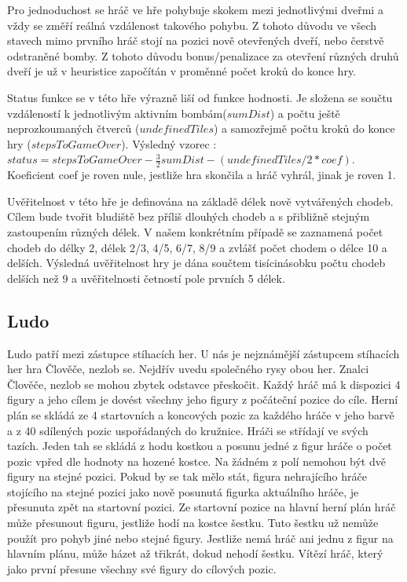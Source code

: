 Pro jednoduchost se hráč ve hře pohybuje skokem mezi jednotlivými dveřmi a vždy se změří reálná vzdálenost takového pohybu. Z tohoto důvodu ve všech stavech mimo prvního hráč stojí na pozici nově otevřených dveří, nebo čerstvě odstraněné bomby. Z tohoto důvodu bonus/penalizace za otevření různých druhů dveří je už v heuristice započítán v proměnné počet kroků do konce hry.

Status funkce se v této hře výrazně liší od funkce hodnosti. Je složena se součtu vzdáleností k jednotlivým aktivním bombám($sumDist$) a počtu ještě neprozkoumaných čtverců ($undefinedTiles$) a samozřejmě počtu kroků do konce hry ($stepsToGameOver$). Výsledný vzorec : $status = stepsToGameOver - \frac{3}{2}sumDist-(undefinedTiles / 2 * coef)$. Koeficient coef je roven nule, jestliže hra skončila a hráč vyhrál, jinak je roven 1. 

Uvěřitelnost v této hře je definována na základě délek nově vytvářených chodeb. Cílem bude tvořit bludiště bez příliš dlouhých chodeb a s přibližně stejným zastoupením různých délek. V našem konkrétním případě se zaznamená počet chodeb do délky 2, délek 2/3, 4/5, 6/7, 8/9 a zvlášť počet chodem o délce 10 a delších. Výsledná uvěřitelnost hry je dána součtem tisícinásobku počtu chodeb delších než 9 a uvěřitelnosti četností pole prvních 5 délek.

\subsection{Ludo}

Ludo patří mezi zástupce stíhacích her. U nás je nejznámější zástupcem stíhacích her hra Člověče, nezlob se. Nejdřív uvedu společného rysy obou her. Znalci Člověče, nezlob se mohou zbytek odstavce přeskočit. Každý hráč má k dispozici 4 figury a jeho cílem je dovést všechny jeho figury z počáteční pozice do cíle. Herní plán se skládá ze 4 startovních a koncových pozic za každého hráče v jeho barvě a z 40 sdílených pozic uspořádaných do kružnice. Hráči se střídají ve svých tazích. Jeden tah se skládá z hodu kostkou a posunu jedné z figur hráče o počet pozic vpřed dle hodnoty na hozené kostce. Na žádném z polí nemohou být dvě figury na stejné pozici. Pokud by se tak mělo stát, figura nehrajícího hráče stojícího na stejné pozici jako nově posunutá figurka aktuálního hráče, je přesunuta zpět na startovní pozici. Ze startovní pozice na hlavní herní plán hráč může přesunout figuru, jestliže hodí na kostce šestku. Tuto šestku už nemůže použít pro pohyb jiné nebo stejné figury. Jestliže nemá hráč ani jednu z figur na hlavním plánu, může házet až třikrát, dokud nehodí šestku. Vítězí hráč, který jako první přesune všechny své figury do cílových pozic.

